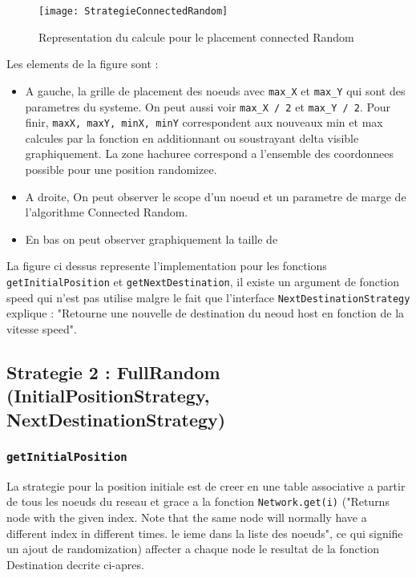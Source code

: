 \documentclass[11pt,a4paper,sans]{report}
\begin{document}
	\begin{figure}[H]
		\centering
		\texttt{[image: StrategieConnectedRandom]}
		\caption{Representation du calcule pour le placement connected Random}
	\end{figure}


	\par Les elements de la figure %
	sont :
	\begin{itemize}
		\item A gauche, la grille de placement des noeuds avec \texttt{max\_X} et \texttt{max\_Y} qui sont des parametres du systeme. On peut aussi voir \texttt{max\_X / 2} et \texttt{max\_Y / 2}. Pour finir, \texttt{maxX, maxY, minX, minY} correspondent aux nouveaux min et max calcules par la fonction en additionnant ou soustrayant delta visible graphiquement. La zone hachuree correspond a l'ensemble des coordonnees possible pour une position randomizee.
		\item A droite, On peut observer le scope d'un noeud et un parametre de marge de l'algorithme Connected Random.
		\item En bas on peut observer graphiquement la taille de 
	\end{itemize}

	La figure ci dessus %
	represente l'implementation pour les fonctions \texttt{getInitialPosition} et \texttt{getNextDestination}, il existe un argument de fonction speed qui n'est pas utilise malgre le fait que l'interface \texttt{NextDestinationStrategy} explique : "Retourne une nouvelle de destination du neoud host en fonction de la vitesse speed".

	\subsection*{Strategie 2 : FullRandom (InitialPositionStrategy, NextDestinationStrategy)}

	\subsubsection{\texttt{getInitialPosition}}
	\par La strategie pour la position initiale est de creer en une table associative a partir de tous les noeuds du reseau et grace a la fonction \texttt{Network.get(i)} ("Returns node with the given index. Note that the same node will normally have a different index in different times. le ieme dans la liste des noeuds", ce qui signifie un ajout de randomization) affecter a chaque node le resultat de la fonction Destination decrite ci-apres.
\end{document}
